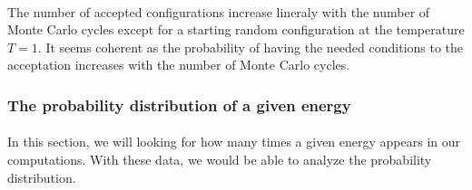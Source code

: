 \documentclass[a4paper, twoside, 11pt]{report}
\theoremstyle{theorem}
\theoremstyle{remark}
\theoremstyle{exemple}
\begin{document}
            \paragraph{}The number of accepted configurations increase lineraly with the number of Monte Carlo cycles except for a starting random configuration at the temperature $T=1$. It seems coherent as the probability of having the needed conditions to the acceptation increases with the number of Monte Carlo cycles.          
        
            \subsubsection{The probability distribution of a given energy}
            
            \paragraph{}In this section, we will looking for how many times a given energy appears in our computations. With these data, we would be able to analyze the probability distribution. 
            
\end{document}
